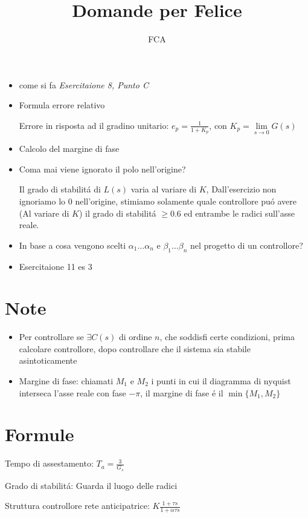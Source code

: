 \documentclass{article}
\title{Domande per Felice}
\author{FCA}
\begin{document}
\maketitle{}

\begin{itemize}
    \item come si fa \textit{Esercitaione 8, Punto C}
    \item Formula errore relativo

        Errore in risposta ad il gradino unitario: $e_p = \frac{1}{1+K_p}$, con $K_p = \lim\limits_{s\to 0} G(s)$
    \item Calcolo del margine di fase
    \item Coma mai viene ignorato il polo nell'origine?

        Il grado di stabilit\'a di $L(s)$ varia al variare di $K$, Dall'esercizio non ignoriamo lo 0 nell'origine, stimiamo solamente quale controllore pu\'o avere (Al variare di $K$) il grado di stabilit\'a $\ge 0.6$ ed entrambe le radici sull'asse reale.

    \item In base a cosa vengono scelti $\alpha_1 \ldots \alpha_n$ e $\beta_1 \ldots \beta_n$ nel progetto di un controllore?
    \item Esercitaione 11 es 3
\end{itemize}

\section{Note}
\begin{itemize}
    \item Per controllare se $\exists C(s)$ di ordine $n$, che soddisfi certe condizioni, prima calcolare controllore, dopo controllare che il sistema sia stabile asintoticamente
    \item Margine di fase: chiamati $M_1$ e $M_2$ i punti in cui il diagramma di nyquist interseca l'asse reale con fase $-\pi$, il margine di fase \'e il $\min\{M_1, M_2\}$
\end{itemize}

\section{Formule}
Tempo di assestamento: \( T_a = \frac{3}{G_s} \)

Grado di stabilit\'a: Guarda il luogo delle radici

Struttura controllore rete anticipatrice: $K\frac{1 + \tau s}{1 + \alpha \tau s}$
\end{document}
